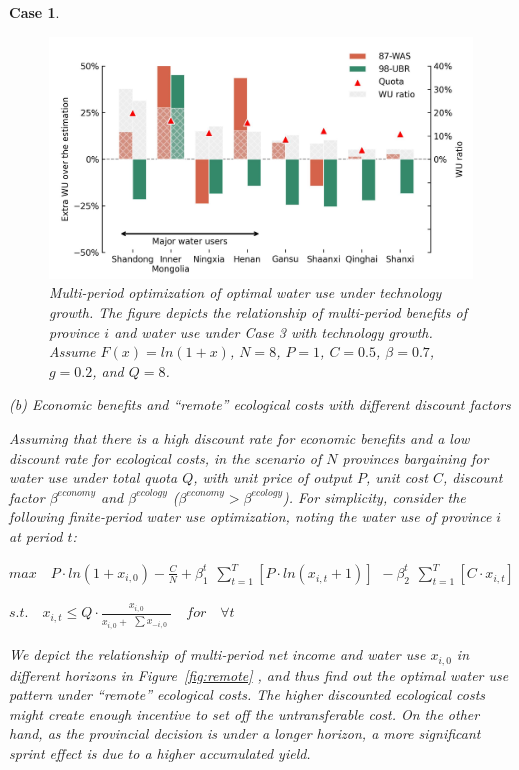 \documentclass[default, sn-standardnature]{sn-jnl} %
\newtheorem{case_appendix}{Case}
\begin{document}
\begin{case_appendix}
\begin{figure}[H]
    \centering
    \includegraphics[width=0.9\linewidth]{outputs/Fig3.jpg}
    \caption{Multi-period optimization of optimal water use under technology growth. The figure depicts the relationship of multi-period benefits of province $i$ and water use under Case 3 with technology growth. Assume $F(x)=ln(1+x)$, $N=8$, $P=1$, $C=0.5$, $\beta=0.7$, $g=0.2$, and $Q=8$.}
    \label{fig:technology}
\end{figure}

(b) Economic benefits and ``remote'' ecological costs with different discount factors

Assuming that there is a high discount rate for economic benefits and a low discount rate for ecological costs, in the scenario of $N$ provinces bargaining for water use under total quota $Q$, with unit price of output $P$, unit cost $C$, discount factor $\beta^{economy}$ and $\beta^{ecology}$ ($\beta^{economy} > \beta^{ecology}$). For simplicity, consider the following finite-period water use optimization, noting the water use of province $i$ at period $t$:

$ max \quad P \cdot ln(1+x_{i,0})-\frac{C}{N}+\beta_1^t \begin{matrix} \sum_{t=1}^T [P \cdot ln(x_{i,t}+1)]  \end{matrix} - \beta_2^t \begin{matrix} \sum_{t=1}^T [C \cdot x_{i,t}] \end{matrix}$

$s.t. \quad x_{i,t} \leq Q \cdot \frac{x_{i,0}}{x_{i,0} + \begin{matrix} \sum x_{-i,0} \end{matrix}} \quad for \quad \forall t$

We depict the relationship of multi-period net income and water use $x_{i,0}$ in different horizons in Figure~\ref{fig:remote}
, and thus find out the optimal water use pattern under ``remote'' ecological costs. The higher discounted ecological costs might create enough incentive to set off the untransferable cost. On the other hand, as the provincial decision is under a longer horizon, a more significant sprint effect is due to a higher accumulated yield.


\end{case_appendix}
\end{document}

